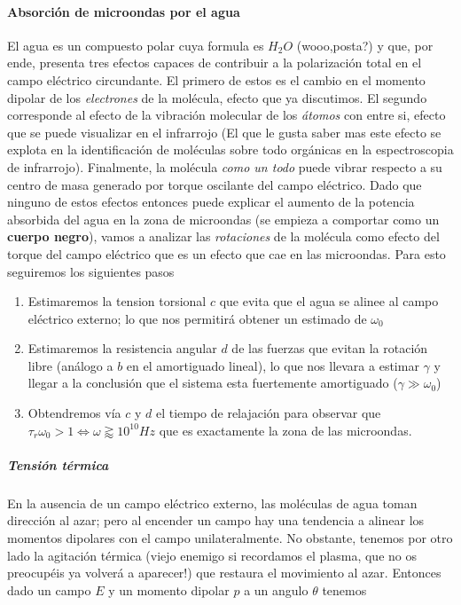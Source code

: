 \documentclass[a4paper,spanish]{article}
\numberwithin{equation}{section}
\begin{document}
\paragraph{Absorci\'on de microondas por el agua}
El agua es un compuesto polar cuya formula es $H_2O$ (wooo,posta?) y que, por ende, presenta tres efectos capaces de contribuir a la polarizaci\'on total en el campo el\'ectrico circundante. El primero de estos es el cambio en el momento dipolar de los \textit{electrones} de la mol\'ecula, efecto que ya discutimos. El segundo corresponde al efecto de la vibraci\'on molecular de los \textit{\'atomos} con entre si, efecto que se puede visualizar en el infrarrojo (El que le gusta saber mas este efecto se explota en la identificaci\'on de mol\'eculas sobre todo org\'anicas en la espectroscopia de infrarrojo). Finalmente, la mol\'ecula \textit{como un todo} puede vibrar respecto a su centro de masa generado por torque oscilante del campo el\'ectrico. Dado que ninguno de estos efectos entonces puede explicar el aumento de la potencia absorbida del agua en la zona de microondas (se empieza a comportar como un \textbf{cuerpo negro}), vamos a analizar las \textit{rotaciones} de la mol\'ecula como efecto del torque del campo el\'ectrico que es un efecto que cae en las microondas. Para esto seguiremos los siguientes pasos 

\begin{enumerate}
\item Estimaremos la tension torsional $c$ que evita que el agua se alinee al campo el\'ectrico externo; lo que nos permitir\'a obtener un estimado de $\omega_0$
\item Estimaremos la resistencia angular $d$ de las fuerzas que evitan la rotaci\'on libre (an\'alogo a $b$ en el amortiguado lineal), lo que nos llevara a estimar $\gamma$ y llegar a la conclusi\'on que el sistema esta fuertemente amortiguado ($\gamma\gg\omega_0$)
\item Obtendremos v\'ia $c$ y $d$ el tiempo de relajaci\'on para observar que $\tau_r\omega_0>1 \Leftrightarrow \omega \gtrapprox 10^{10} Hz$ que es exactamente la zona de las microondas.
\end{enumerate}

\subparagraph*{Tensi\'on t\'ermica}
En la ausencia de un campo el\'ectrico externo, las mol\'eculas de agua toman direcci\'on al azar; pero al encender un campo hay una tendencia a alinear los momentos dipolares con el campo unilateralmente. No obstante, tenemos por otro lado la agitaci\'on t\'ermica (viejo enemigo si recordamos el plasma, que no os preocup\'eis ya volver\'a a aparecer!) que restaura el movimiento al azar. Entonces dado un campo $E$ y un momento dipolar $p$ a un angulo $\theta$ tenemos
\end{document}
